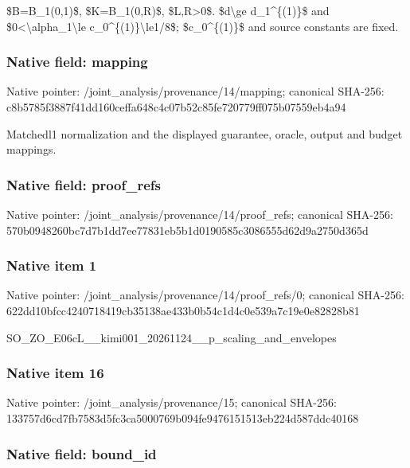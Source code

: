 \documentclass[10pt,a4paper]{article}
\begin{document}
\$B=B\_1(0,1)\$, \$K=B\_1(0,R)\$, \$L,R>0\$. \$d\textbackslash{}ge d\_1\textasciicircum{}\{(1)\}\$ and \$0<\textbackslash{}alpha\_1\textbackslash{}le c\_0\textasciicircum{}\{(1)\}\textbackslash{}le1/8\$; \$c\_0\textasciicircum{}\{(1)\}\$ and source constants are fixed.


\subsubsection{Native field: mapping}


Native pointer: /joint\_analysis/provenance/14/mapping; canonical SHA-256: c8b5785f3887f41dd160ceff\allowbreak{}a648c4c07b52c85fe720779f\allowbreak{}f075b07559eb4a94


Matchedl1 normalization and the displayed guarantee, oracle, output and budget mappings.


\subsubsection{Native field: proof\_refs}


Native pointer: /joint\_analysis/provenan\allowbreak{}ce/14/proof\_refs; canonical SHA-256: 570b0948260bc7d7b1dd7ee7\allowbreak{}7831eb5b1d0190585c308655\allowbreak{}5d62d9a2750d365d



\subsubsection{Native item 1}


Native pointer: /joint\_analysis/provenan\allowbreak{}ce/14/proof\_refs/0; canonical SHA-256: 622dd10bfcc4240718419cb3\allowbreak{}5138ae433b0b54c1d4c0e539\allowbreak{}a7c19e0e82828b81


SO\_ZO\_E06cL\_\_kimi001\_202\allowbreak{}61124\_\_p\_scaling\_and\_env\allowbreak{}elopes


\subsubsection{Native item 16}


Native pointer: /joint\_analysis/provenance/15; canonical SHA-256: 133757d6cd7fb7583d5fc3ca\allowbreak{}5000769b094fe9476151513e\allowbreak{}b224d587ddc40168



\subsubsection{Native field: bound\_id}
\end{document}
